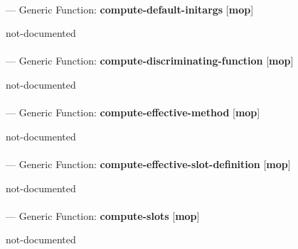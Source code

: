 \paragraph{}
\label{MOP:COMPUTE-DEFAULT-INITARGS}
--- Generic Function: \textbf{compute-default-initargs} [\textbf{mop}] \textit{}

\begin{adjustwidth}{5em}{5em}
not-documented
\end{adjustwidth}

\paragraph{}
\label{MOP:COMPUTE-DISCRIMINATING-FUNCTION}
--- Generic Function: \textbf{compute-discriminating-function} [\textbf{mop}] \textit{}

\begin{adjustwidth}{5em}{5em}
not-documented
\end{adjustwidth}

\paragraph{}
\label{MOP:COMPUTE-EFFECTIVE-METHOD}
--- Generic Function: \textbf{compute-effective-method} [\textbf{mop}] \textit{}

\begin{adjustwidth}{5em}{5em}
not-documented
\end{adjustwidth}

\paragraph{}
\label{MOP:COMPUTE-EFFECTIVE-SLOT-DEFINITION}
--- Generic Function: \textbf{compute-effective-slot-definition} [\textbf{mop}] \textit{}

\begin{adjustwidth}{5em}{5em}
not-documented
\end{adjustwidth}

\paragraph{}
\label{MOP:COMPUTE-SLOTS}
--- Generic Function: \textbf{compute-slots} [\textbf{mop}] \textit{}

\begin{adjustwidth}{5em}{5em}
not-documented
\end{adjustwidth}

